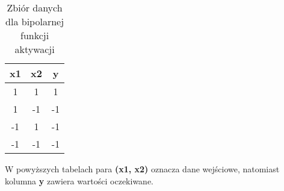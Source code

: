 \documentclass[../main.tex]{subfiles}
\begin{document}
        \begin{table}[h]
    \centering
    \begin{tabular}{|| c | c | c ||}
    \hline
    x1 & x2 & y \\ \hline
    1  & 1  & 1 \\
    1  & -1  & -1 \\
    -1 & 1  & -1 \\
    -1  & -1  & -1 \\ \hline
    \end{tabular}
    \caption{Zbiór danych dla bipolarnej funkcji aktywacji}
    \label{dataset_unipolar:1}
    \end{table}
    
    W powyższych tabelach para \textbf{(x1, x2)} oznacza dane wejściowe, natomiast kolumna \textbf{y} zawiera wartości oczekiwane.
\end{document}
